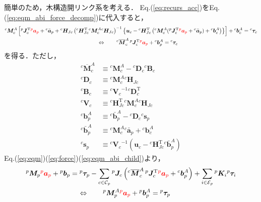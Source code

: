﻿\documentclass[a4paper]{jsarticle}
\begin{document}
簡単のため，木構造開リンク系を考える．
Eq.(\ref{eq:recurs_acc})をEq.(\ref{eq:eqm_abi_force_decomp})に代入すると，
\begin{align}
&{}^{c}\bm{M}^{A}_{c}
\left[
 {}^{p}\bm{J}_{c}^{\mathrm{T}}\textcolor{red}{{}^{p}\bm{a}_{p}}+{}^{c}\bar{\bm{a}}_{p}
+{}^{c}\bm{H}_{Jc}
 \left({}^{c}\bm{H}_{Jc}^{\mathrm{T}}{}^{c}\bm{M}^{A}_{c}{}^{c}\bm{H}_{Jc}\right)^{-1}
\left\{\bm{u}_{c}
 -{}^{c}\bm{H}_{Jc}^{\mathrm{T}}
  \left({}^{c}\bm{M}^{A}_{c}({}^{p}\bm{J}_{c}^{\mathrm{T}}\textcolor{red}{{}^{p}\bm{a}_{p}}+{}^{c}\bar{\bm{a}}_{p})
  +{}^{c}\bm{b}^{A}_{c}\right)
\right\}
\right]
+{}^{c}\bm{b}^{A}_{c}
 ={}^{c}\bm{\tau}_{c}
 \nonumber \\
&\hskip6cm\Leftrightarrow\qquad
{}^{c}\overline{\bm{M}}^{A}_{c}\,{}^{p}\bm{J}_{c}^{\mathrm{T}}\textcolor{red}{{}^{p}\bm{a}_{p}}+{}^{c}\bm{b}^{A}_{p}
 ={}^{c}\bm{\tau}_{c}
\label{eq:eqm_abi_child}
\end{align}
を得る．ただし，
\begin{align}
{}^{c}\overline{\bm{M}}^{A}_{c}
&\equiv {}^{c}\bm{M}^{A}_{c}-{}^{c}\bm{D}_{c}{}^{c}\bm{B}_{c}
\label{eq:abi_child}
\\
{}^{c}\bm{D}_{c}
&\equiv {}^{c}\bm{M}^{A}_{c} {}^{c}\bm{H}_{Jc}
\\
{}^{c}\bm{B}_{c}
&\equiv {{}^{c}\bm{V}_{c}}^{-1} {}^{c}\bm{D}_{c}^{\mathrm{T}}
\\
{}^{c}\bm{V}_{c}
&\equiv {}^{c}\bm{H}_{Jc}^{\mathrm{T}}{}^{c}\bm{M}^{A}_{c}{}^{c}\bm{H}_{Jc}
\\
{}^{c}\bm{b}^{A}_{p}
&\equiv {}^{c}\bar{\bm{b}}^{A}_{p}-{}^{c}\bm{D}_{c} {}^{c}\bm{s}_{p}
\label{eq:abb_child}
\\
{}^{c}\bar{\bm{b}}^{A}_{p}
&\equiv {}^{c}\bm{M}^{A}_{c}{}^{c}\bar{\bm{a}}_{p} + {}^{c}\bm{b}^{A}_{c}
\\
{}^{c}\bm{s}_{p}
&\equiv
{{}^{c}\bm{V}_{c}}^{-1}(\bm{u}_{c}-{}^{c}\bm{H}_{Jc}^{\mathrm{T}}{}^{c}\bar{\bm{b}}^{A}_{p})
\label{eq:abb_last}
\end{align}
%
Eq.(\ref{eq:eqm})(\ref{eq:force})(\ref{eq:eqm_abi_child})より，
\begin{align}
&{}^{p}\bm{M}_{p}\textcolor{red}{{}^{p}\bm{a}_{p}}+{}^{p}\bm{b}_{p}
={}^{p}\bm{\tau}_{p}
 -\sum_{c\in\mathcal{C}_{p}}
 {}^{p}\bm{J}_{c} \left({}^{c}\overline{\bm{M}}^{A}_{c}\,{}^{p}\bm{J}_{c}^{\mathrm{T}}\textcolor{red}{{}^{p}\bm{a}_{p}}+{}^{c}\bm{b}^{A}_{p}\right)
 +\sum_{i\in\mathcal{E}_{p}}{}^{p}\bm{K}_{i}{}^{p}\bm{\tau}_{i}
\nonumber \\
&\hskip2.6cm\Leftrightarrow\qquad
{}^{p}\bm{M}^{A}_{p}\textcolor{red}{{}^{p}\bm{a}_{p}}+{}^{p}\bm{b}^{A}_{p}
 ={}^{p}\bm{\tau}_{p}
\end{align}
\end{document}
